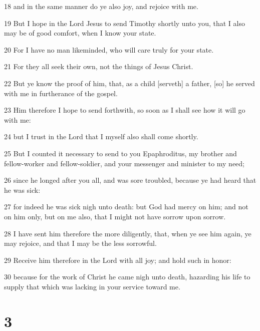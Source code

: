 \par 18 and in the same manner do ye also joy, and rejoice with me.
\par 19 But I hope in the Lord Jesus to send Timothy shortly unto you, that I also may be of good comfort, when I know your state.
\par 20 For I have no man likeminded, who will care truly for your state.
\par 21 For they all seek their own, not the things of Jesus Christ.
\par 22 But ye know the proof of him, that, as a child [serveth] a father, [so] he served with me in furtherance of the gospel.
\par 23 Him therefore I hope to send forthwith, so soon as I shall see how it will go with me:
\par 24 but I trust in the Lord that I myself also shall come shortly.
\par 25 But I counted it necessary to send to you Epaphroditus, my brother and fellow-worker and fellow-soldier, and your messenger and minister to my need;
\par 26 since he longed after you all, and was sore troubled, because ye had heard that he was sick:
\par 27 for indeed he was sick nigh unto death: but God had mercy on him; and not on him only, but on me also, that I might not have sorrow upon sorrow.
\par 28 I have sent him therefore the more diligently, that, when ye see him again, ye may rejoice, and that I may be the less sorrowful.
\par 29 Receive him therefore in the Lord with all joy; and hold such in honor:
\par 30 because for the work of Christ he came nigh unto death, hazarding his life to supply that which was lacking in your service toward me.

\chapter{3}

